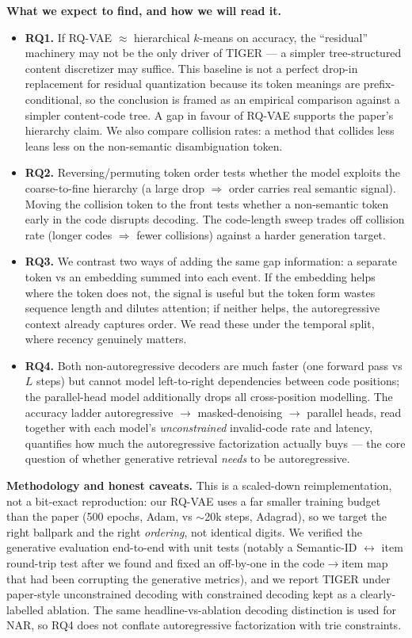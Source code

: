 \documentclass[10pt]{article}
\begin{document}
\textbf{What we expect to find, and how we will read it.}
\begin{itemize}
\item \textbf{RQ1.} If RQ-VAE $\approx$ hierarchical $k$-means on accuracy, the
``residual'' machinery may not be the only driver of TIGER --- a simpler
tree-structured content discretizer may suffice. This baseline is not a perfect
drop-in replacement for residual quantization because its token meanings are
prefix-conditional, so the conclusion is framed as an empirical comparison
against a simpler content-code tree. A gap in favour of RQ-VAE supports the
paper's hierarchy claim. We also compare collision rates: a method that collides
less leans less on the non-semantic disambiguation token.
\item \textbf{RQ2.} Reversing/permuting token order tests whether the model
exploits the coarse-to-fine hierarchy (a large drop $\Rightarrow$ order carries
real semantic signal). Moving the collision token to the front tests whether a
non-semantic token early in the code disrupts decoding. The code-length sweep
trades off collision rate (longer codes $\Rightarrow$ fewer collisions) against a
harder generation target.
\item \textbf{RQ3.} We contrast two ways of adding the same gap information: a
separate token vs an embedding summed into each event. If the embedding helps
where the token does not, the signal is useful but the token form wastes
sequence length and dilutes attention; if neither helps, the autoregressive
context already captures order. We read these under the temporal split, where
recency genuinely matters.
\item \textbf{RQ4.} Both non-autoregressive decoders are much faster (one forward
pass vs $L$ steps) but cannot model left-to-right dependencies between code
positions; the parallel-head model additionally drops all cross-position
modelling. The accuracy ladder autoregressive $\to$ masked-denoising $\to$
parallel heads, read together with each model's \emph{unconstrained} invalid-code
rate and latency, quantifies how much the autoregressive factorization actually
buys --- the core question of whether generative retrieval \emph{needs} to be
autoregressive.
\end{itemize}

\textbf{Methodology and honest caveats.} This is a scaled-down reimplementation,
not a bit-exact reproduction: our RQ-VAE uses a far smaller training budget than
the paper (500 epochs, Adam, vs $\sim$20k steps, Adagrad), so we target the right
ballpark and the right \emph{ordering}, not identical digits. We verified the
generative evaluation end-to-end with unit tests (notably a Semantic-ID
$\leftrightarrow$ item round-trip test after we found and fixed an off-by-one in
the code$\to$item map that had been corrupting the generative metrics), and we
report TIGER under paper-style unconstrained decoding with constrained decoding
kept as a clearly-labelled ablation. The same headline-vs-ablation decoding
distinction is used for NAR, so RQ4 does not conflate autoregressive
factorization with trie constraints.
\end{document}

